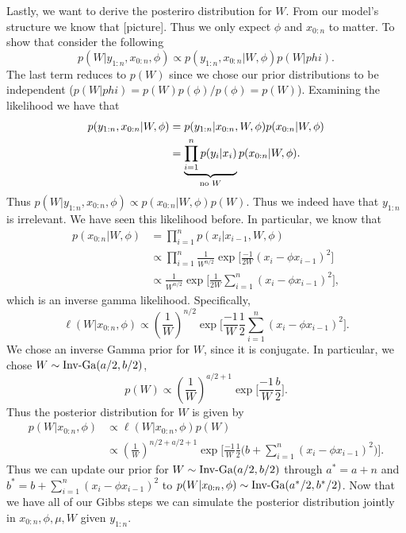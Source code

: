 \documentclass{article}
\begin{document}
Lastly, we want to derive the posteriro distribution for $W$. From our model's structure we know that [picture].  Thus we only expect $\phi$ and $x_{0:n}$ to matter.  To show that consider the following
\[
p(W | y_{1:n}, x_{0:n}, \phi) 
\propto p(y_{1:n}, x_{0:n} | W, \phi) p(W | phi).
\]
The last term reduces to $p(W)$ since we chose our prior distributions to be independent ($p(W|phi) = p(W)p(\phi)/p(\phi) = p(W)$).  Examining the likelihood we have that
\begin{align*}
p(y_{1:n}, x_{0:n} | W, \phi) 
& = p(y_{1:n} | x_{0:n}, W, \phi) p(x_{0:n} | W, \phi) \\
& = 
\underbrace{ \prod_{i=1}^n p(y_i | x_i) }_{\textmd{ no $W$ }}
p(x_{0:n} | W, \phi).
\end{align*}
Thus $p(W | y_{1:n}, x_{0:n}, \phi) \propto p(x_{0:n} | W, \phi) p(W)$.  Thus we indeed have that $y_{1:n}$ is irrelevant.  We have seen this likelihood before.  In particular, we know that
\begin{align*}
p(x_{0:n} | W, \phi) 
& = \prod_{i=1}^n p(x_i | x_{i-1}, W, \phi) \\
& \propto \prod_{i=1}^n \frac{1}{W^{n/2}} \exp \Big[ \frac{-1}{2W} (x_i - \phi x_{i-1})^2 \Big] \\
& \propto \frac{1}{W^{n/2}} \exp \Big[ \frac{1}{2W} \sum_{i=1}^n (x_i - \phi x_{i-1})^2 \Big],
\end{align*}
which is an inverse gamma likelihood.  Specifically,
\[
\ell (W | x_{0:n}, \phi) \propto (\frac{1}{W})^{n/2} \exp \Big[ \frac{-1}{W} \frac{1}{2} \sum_{i=1}^n (x_i - \phi x_{i-1})^2 \Big].
\]
We chose an inverse Gamma prior for $W$, since it is conjugate.  In particular, we chose $W \sim \textmd{Inv-Ga}(a/2, b/2)$,
\[
p(W) \propto (\frac{1}{W})^{a/2 + 1} \exp \Big[ \frac{-1}{W} \frac{b}{2} \Big].
\]
Thus the posterior distribution for $W$ is given by
\begin{align*}
p(W | x_{0:n}, \phi) 
& \propto \ell(W | x_{0:n}, \phi) p(W) \\
& \propto (\frac{1}{W})^{n/2 + a/2 + 1} \exp \Big[ \frac{-1}{W} \frac{1}{2} \Big( b + \sum_{i=1}^n (x_i - \phi x_{i-1})^2 \Big) \Big].
\end{align*}
Thus we can update our prior for $W \sim \textmd{Inv-Ga}(a/2, b/2)$ through $a^* = a + n$ and $b^* = b + \sum_{i=1}^n (x_i - \phi x_{i-1})^2$ to $p(W | x_{0:n}, \phi) \sim \textmd{Inv-Ga}(a^*/2, b^*/2)$.  Now that we have all of our Gibbs steps we can simulate the posterior distribution jointly in $x_{0:n}, \phi, \mu, W$ given $y_{1:n}$.
\end{document}
